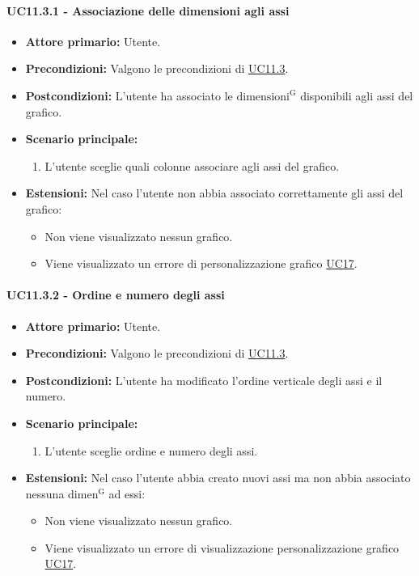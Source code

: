 \paragraph{UC11.3.1 - Associazione delle dimensioni agli assi}
\label{sec:UC11.3.1}
    \begin{itemize}
        \item \textbf{Attore primario:} Utente.
        \item \textbf{Precondizioni:} Valgono le precondizioni di \hyperref[sec:UC11.3]{UC11.3}.
	    \item \textbf{Postcondizioni:} L'utente ha associato le ${\mathrm{dimensioni^{G}}}$ disponibili agli assi del grafico.
	    \item \textbf{Scenario principale:} 
	    \begin{enumerate}
	    		\item L'utente sceglie quali colonne associare agli assi del grafico.
		\end{enumerate}
	    \item \textbf{Estensioni:} Nel caso l'utente non abbia associato correttamente gli assi del grafico:
              \begin{itemize}
                  \item Non viene visualizzato nessun grafico.
                  \item Viene visualizzato un errore di personalizzazione grafico \hyperref[sec:UC17 - Errore di personalizzazione]{UC17}.
              \end{itemize}
    \end{itemize}
    
\paragraph{UC11.3.2 - Ordine e numero degli assi}
\label{sec:UC11.3.2}
    \begin{itemize}
        \item \textbf{Attore primario:} Utente.
        \item \textbf{Precondizioni:} Valgono le precondizioni di \hyperref[sec:UC11.3]{UC11.3}.
	    \item \textbf{Postcondizioni:} L'utente ha modificato l'ordine verticale degli assi e il numero.
	    \item \textbf{Scenario principale:} 
	    \begin{enumerate}
	    		\item L'utente sceglie ordine e numero degli assi.
		\end{enumerate}
	    \item \textbf{Estensioni:} Nel caso l'utente abbia creato nuovi assi ma non abbia associato nessuna ${\mathrm{dimen^{G}}}$ ad essi:
              \begin{itemize}
                  \item Non viene visualizzato nessun grafico.
                  \item Viene visualizzato un errore di visualizzazione personalizzazione grafico \hyperref[sec:UC17 - Errore di personalizzazione]{UC17}.
              \end{itemize}
    \end{itemize}
    
